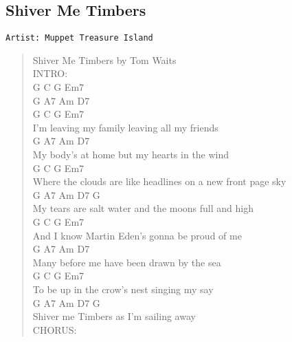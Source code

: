 \documentclass[11pt]{article}
\begin{document}
\subsection{Shiver Me Timbers}
\label{sec:org35c0c25}
\begin{verbatim}
Artist: Muppet Treasure Island
\end{verbatim}
\begin{verse}
Shiver Me Timbers by Tom Waits\\
INTRO:\\
\vspace*{1em}
G    C    G    Em7\\
G    A7   Am   D7\\
\vspace*{1em}
\vspace*{1em}
G              C     G               Em7\\
I'm leaving my family leaving all my friends\\
G            A7           Am            D7\\
My body's at home but my hearts in the wind\\
\hspace*{10em}G              C               G             Em7\\
Where the clouds are like headlines on a new front page sky\\
\hspace*{3em}G             A7             Am        D7   G\\
My tears are salt water and the moons full and high\\
\vspace*{1em}
G                 C           G           Em7\\
And I know Martin Eden's gonna be proud of me\\
G           A7           Am           D7\\
Many before me have been drawn by the sea\\
\hspace*{5em}G                C    G          Em7\\
To be up in the crow's nest singing my say\\
G         A7             Am     D7  G\\
Shiver me Timbers as I'm sailing away\\
\vspace*{1em}
\vspace*{1em}
CHORUS:\\
\vspace*{1em}

\end{verse}
\end{document}
